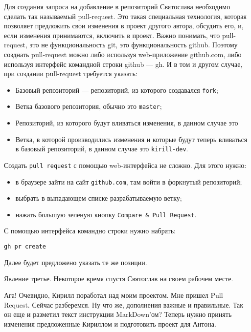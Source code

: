 \documentclass[14pt,a4paper]{article}
\begin{document}
Для создания запроса на добавление в репозиторий Святослава необходимо сделать так называемый
pull-request. Это такая специальная технология, которая позволяет предложить свои изменения 
в проект другого автора, обсудить его, и, если изменения принимаются, включить в проект.
Важно понимать, что  pull-request, это не функциональность git, это функциональность github.
Поэтому созднать pull-request можно либо используя web-приложение github.com, либо 
используя интерфейс командной строки github --- gh. И в том и другом случае, при создании 
pull-request требуется указать:
\begin{itemize}
	\item Базовый репозиторий --- репозиторий, из которого создавался \texttt{fork};
	\item Ветка базового репозитория, обычно это \texttt{master};
	\item Репозиторий, из которого будут вливаться изменения, в данном случае это
	\item Ветка, в которой производились изменения и которые будут теперь вливаться в 
		базовый репозиторий, в данном случае это \texttt{kirill-dev}.
\end{itemize}
Создать \texttt{pull request} с помощью web-интерфейса не сложно. Для этого нужно:
\begin{itemize}
	\item в браузере зайти на сайт \texttt{github.com}, там войти в форкнутый репозиторий;
	\item выбрать в выпадающем списке разрабатываемую ветку;
	\item нажать большую зеленую кнопку \texttt{Compare \& Pull Request}.
\end{itemize}
С помощью интерфейса командно строки нужно набрать:
\begin{verbatim}
gh pr create
\end{verbatim}
Далее будет предложено указать те же позиции.

Явление третье.
Некоторое время спустя Святослав на своем рабочем месте.

 Ага! Очевидно, Кирилл поработал над моим проектом. Мне пришел  Pull Request.
Сейчас разберемся. Ну что же, дополнения важные и правильные. Так он еще и разметил текст
инструкции MarkDown'ом? 
Теперь нужно принять изменения предложенные Кириллом и подготовить проект для Антона.
\end{document}

